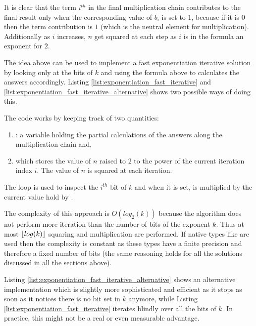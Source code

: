 It is clear that the term $i^{th}$ in the final multiplication chain contributes to the final result only when the corresponding value of $b_i$ is set to $1$, because if it is $0$ then the term contribution is $1$ (which is the neutral element for multiplication).
Additionally as $i$ increases, $n$ get squared at each step as $i$ is in the formula an exponent for $2$. 


The idea above can be used to implement
a fast exponentiation iterative solution by looking only at the bits of $k$ and using the formula above to calculates the answers accordingly. 
Listing \ref{list:exponentiation_fast_iterative} and \ref{list:exponentiation_fast_iterative_alternative} shows two  possible ways of doing this.




The code works by keeping track of two quantities:
\begin{enumerate}
    \item {}: a variable holding the partial calculations of the answers along the multiplication chain and, 
    \item {} which stores the value of $n$ raised to $2$ to the power of the current iteration index $i$. The value of $n$ is squared at each iteration.
\end{enumerate}
The loop is used to inspect the $i^{th}$ bit of $k$ and when it is set,  is multiplied by the current value hold by . 


The complexity of this approach is $O(log_2(k))$ because the algorithm does not perform more
iteration than the number of bits of the exponent $k$. Thus at most $\lfloor log(k)\rfloor$ squaring and
multiplication are performed. If native types like  are used then the complexity is constant as these types have a finite precision and therefore a fixed number of bits (the same reasoning holds for all the solutions discussed in all the sections above). 

Listing \ref{list:exponentiation_fast_iterative_alternative} shows an alternative implementation which is slightly more sophisticated and efficient as it stops  as soon as it notices there is no bit set in $k$ anymore,  while Listing \ref{list:exponentiation_fast_iterative} iterates blindly over all the bits of $k$. 
In practice, this might not be a real or even measurable advantage.


